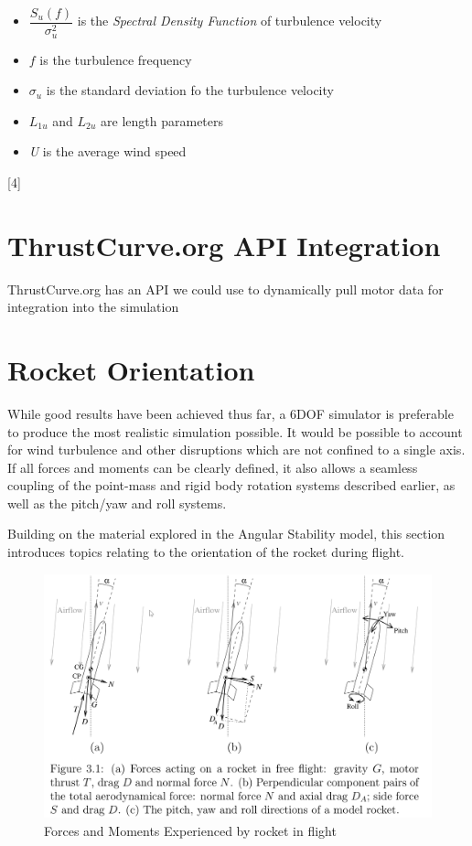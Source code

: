 \documentclass[]{book}
\providecommand{\tightlist}{%
  \setlength{\itemsep}{0pt}\setlength{\parskip}{0pt}}
\begin{document}
\begin{itemize}
\tightlist
\item
  \(\dfrac{S_u (f)}{\sigma ^2 _ u}\) is the \emph{Spectral Density
  Function} of turbulence velocity
\item
  \(f\) is the turbulence frequency
\item
  \(\sigma_u\) is the standard deviation fo the turbulence velocity
\item
  \(L_{1u}\) and \(L_{2u}\) are length parameters
\item
  \emph{U} is the average wind speed
\end{itemize}

{[}4{]}

\section{ThrustCurve.org API
Integration}\label{thrustcurve.org-api-integration}

ThrustCurve.org has an API we could use to dynamically pull motor data
for integration into the simulation

\section{Rocket Orientation}\label{rocket-orientation}

While good results have been achieved thus far, a 6DOF simulator is
preferable to produce the most realistic simulation possible. It would
be possible to account for wind turbulence and other disruptions which
are not confined to a single axis. If all forces and moments can be
clearly defined, it also allows a seamless coupling of the point-mass
and rigid body rotation systems described earlier, as well as the
pitch/yaw and roll systems.

Building on the material explored in the Angular Stability model, this
section introduces topics relating to the orientation of the rocket
during flight.

\begin{figure}[htbp]
\centering
\includegraphics{images/rocket_flight_forces_moments.png}
\caption{Forces and Moments Experienced by rocket in flight
\label{img_rocket_flight_forces_moments_label}}
\end{figure}
\end{document}
